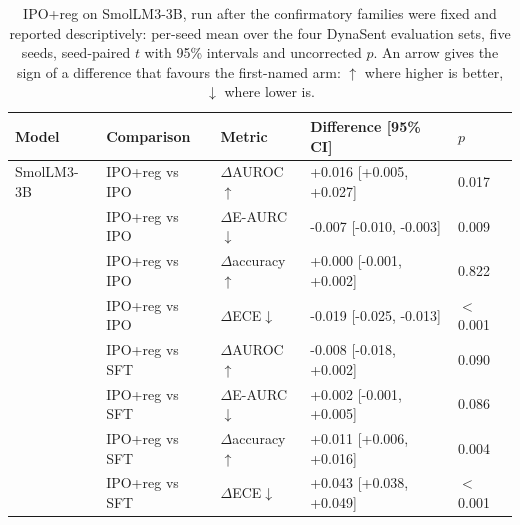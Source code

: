 \begin{table}[t]
\centering
\caption{IPO+reg on SmolLM3-3B, run after the confirmatory families were fixed and reported descriptively: per-seed mean over the four DynaSent evaluation sets, five seeds, seed-paired $t$ with 95\% intervals and uncorrected $p$. An arrow gives the sign of a difference that favours the first-named arm: $\uparrow$ where higher is better, $\downarrow$ where lower is.}
\label{tab:ipo-reg-smollm3}
\footnotesize
\begin{tabular}{lllll}
\toprule
Model & Comparison & Metric & Difference [95\% CI] & $p$ \\
\midrule
SmolLM3-3B & IPO+reg vs IPO & $\Delta$AUROC$\uparrow$ & +0.016 [+0.005, +0.027] & 0.017 \\
 & IPO+reg vs IPO & $\Delta$E-AURC$\downarrow$ & -0.007 [-0.010, -0.003] & 0.009 \\
 & IPO+reg vs IPO & $\Delta$accuracy$\uparrow$ & +0.000 [-0.001, +0.002] & 0.822 \\
 & IPO+reg vs IPO & $\Delta$ECE$\downarrow$ & -0.019 [-0.025, -0.013] & $<$0.001 \\
 & IPO+reg vs SFT & $\Delta$AUROC$\uparrow$ & -0.008 [-0.018, +0.002] & 0.090 \\
 & IPO+reg vs SFT & $\Delta$E-AURC$\downarrow$ & +0.002 [-0.001, +0.005] & 0.086 \\
 & IPO+reg vs SFT & $\Delta$accuracy$\uparrow$ & +0.011 [+0.006, +0.016] & 0.004 \\
 & IPO+reg vs SFT & $\Delta$ECE$\downarrow$ & +0.043 [+0.038, +0.049] & $<$0.001 \\
\bottomrule
\end{tabular}
\end{table}
